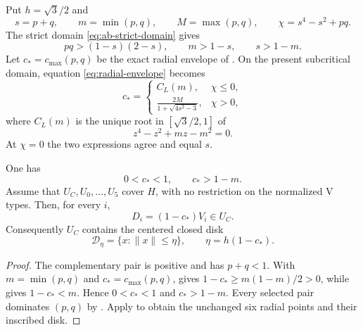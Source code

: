 Put $h=\sqrt3/2$ and
\[
 s=p+q,\qquad m=\min(p,q),\qquad M=\max(p,q),
 \qquad \chi=s^4-s^2+pq.
\]
The strict domain \eqref{eq:ab-strict-domain} gives
\begin{equation}
 pq>(1-s)(2-s),\qquad m>1-s,\qquad s>1-m.         \label{eq:pq-domain}
\end{equation}
Let $c_*=c_{\max}(p,q)$ be the exact radial envelope of
.  On the present subcritical
domain, equation \eqref{eq:radial-envelope} becomes
\begin{equation}
 c_*=\begin{cases}
 C_L(m),&\chi\le0,\\[1mm]
 \displaystyle\frac{2M}{1+\sqrt{4s^2-3}},&\chi>0,
 \end{cases}                                    \label{eq:core-cstar}
\end{equation}
where $C_L(m)$ is the unique root in $[\sqrt3/2,1]$ of
\[
 z^4-z^2+mz-m^2=0.
\]
At $\chi=0$ the two expressions agree and equal $s$.

\begin{lemma}
\label{lem:symmetric-core-witness}
One has
\begin{equation}
 0<c_*<1,\qquad c_*>1-m.                         \label{eq:cstar-bounds}
\end{equation}
Assume that $U_C,U_0,\ldots,U_5$ cover $H$, with no restriction on the
normalized V types. Then, for every $i$,
\[
 D_i=(1-c_*)V_i\in U_C.
\]
Consequently $U_C$ contains the centered closed disk
\begin{equation}
 \mathcal D_\eta=\{x:\lVert x\rVert\le\eta\},
 \qquad \eta=h(1-c_*).                           \label{eq:forced-disk}
\end{equation}
\end{lemma}

\begin{proof}
The complementary pair is positive and has $p+q<1$.
With $m=\min(p,q)$ and $c_*=c_{\max}(p,q)$,  gives
$1-c_*\ge m(1-m)/2>0$, while
 gives $1-c_*<m$.
Hence $0<c_*<1$ and $c_*>1-m$.
Every selected pair dominates $(p,q)$ by .
Apply  to obtain the unchanged
six radial points and their inscribed disk.
\end{proof}

